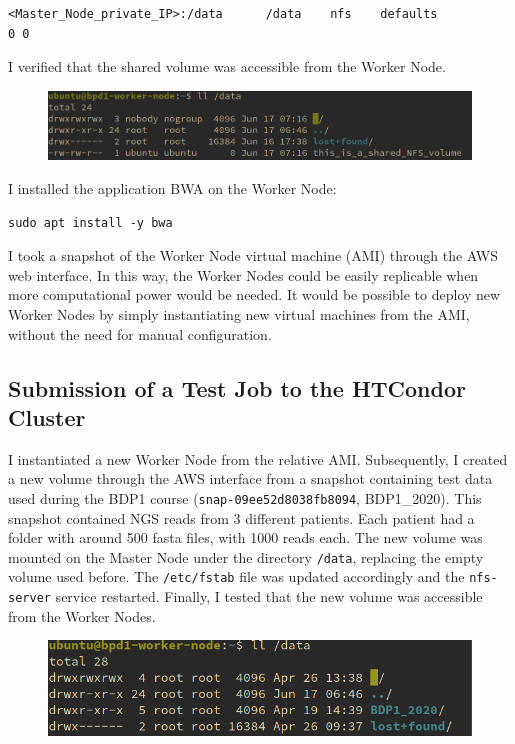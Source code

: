 \documentclass{article}
\begin{document}
\begin{lstlisting}
<Master_Node_private_IP>:/data      /data    nfs    defaults                0 0
\end{lstlisting}

I verified that the shared volume was accessible from the Worker Node.

\begin{figure}[!h]
    \center
    \includegraphics[width=\textwidth]{./images/nfs_works.png}
\end{figure}

I installed the application BWA on the Worker Node:

\begin{lstlisting}
sudo apt install -y bwa
\end{lstlisting}

I took a snapshot of the Worker Node virtual machine (AMI) through the AWS web interface.
In this way, the Worker Nodes could be easily replicable when more computational power would be needed.
It would be possible to deploy new Worker Nodes by simply instantiating new virtual machines from the AMI, without the need for manual configuration.

\subsection{Submission of a Test Job to the HTCondor Cluster}
I instantiated a new Worker Node from the relative AMI.
Subsequently, I created a new volume through the AWS interface from a snapshot containing test data used during the BDP1 course (\texttt{snap-09ee52d8038fb8094}, BDP1\_2020).
This snapshot contained NGS reads from 3 different patients.
Each patient had a folder with around 500 fasta files, with 1000 reads each.
The new volume was mounted on the Master Node under the directory \texttt{/data}, replacing the empty volume used before.
The \texttt{/etc/fstab} file was updated accordingly and the \texttt{nfs-server} service restarted.
Finally, I tested that the new volume was accessible from the Worker Nodes.

\begin{figure}[!h]
    \center
    \includegraphics[width=.8\textwidth]{./images/nfs_bdp_works.png}
\end{figure}
\end{document}
